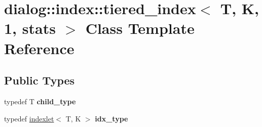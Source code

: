 \hypertarget{classdialog_1_1index_1_1tiered__index_3_01_t_00_01_k_00_011_00_01stats_01_4}{}\section{dialog\+:\+:index\+:\+:tiered\+\_\+index$<$ T, K, 1, stats $>$ Class Template Reference}
\label{classdialog_1_1index_1_1tiered__index_3_01_t_00_01_k_00_011_00_01stats_01_4}
\subsection*{Public Types}
\begin{DoxyCompactItemize}
\item 
\mbox{\label{classdialog_1_1index_1_1tiered__index_3_01_t_00_01_k_00_011_00_01stats_01_4_a7419724958204de6ddec8317cf49e814}} 
typedef T {\bfseries child\+\_\+type}
\item 
\mbox{\label{classdialog_1_1index_1_1tiered__index_3_01_t_00_01_k_00_011_00_01stats_01_4_a6646cfb695409c3bf88e783aa60ce99d}} 
typedef \hyperlink{classdialog_1_1index_1_1indexlet}{indexlet}$<$ T, K $>$ {\bfseries idx\+\_\+type}
\end{DoxyCompactItemize}
